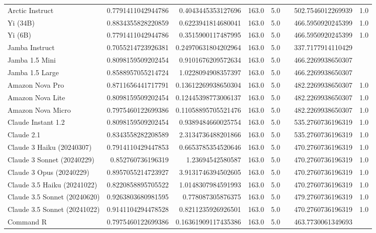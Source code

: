 \begin{table}[htp]
{\begin{tabular}{lrrrrrrr}
Arctic Instruct & 0.7791411042944786 & 0.4043445353127696 & 163.0 & 5.0 &  & 502.7546012269939 & 1.0 \\
Yi (34B) & 0.8834355828220859 & 0.6223941814680041 & 163.0 & 5.0 &  & 466.5950920245399 & 1.0 \\
Yi (6B) & 0.7791411042944786 & 0.3515900117487995 & 163.0 & 5.0 &  & 466.5950920245399 & 1.0 \\
Jamba Instruct & 0.7055214723926381 & 0.24970631804202964 & 163.0 & 5.0 &  & 337.7177914110429 &  \\
Jamba 1.5 Mini & 0.8098159509202454 & 0.9101676209572634 & 163.0 & 5.0 &  & 466.2269938650307 &  \\
Jamba 1.5 Large & 0.8588957055214724 & 1.0228094908357397 & 163.0 & 5.0 &  & 466.2269938650307 &  \\
Amazon Nova Pro & 0.8711656441717791 & 0.13612269938650304 & 163.0 & 5.0 &  & 482.2269938650307 & 1.0 \\
Amazon Nova Lite & 0.8098159509202454 & 0.12445398773006137 & 163.0 & 5.0 &  & 482.2269938650307 & 1.0 \\
Amazon Nova Micro & 0.7975460122699386 & 0.11058895705521476 & 163.0 & 5.0 &  & 482.2269938650307 & 1.0 \\
Claude Instant 1.2 & 0.8098159509202454 & 0.9389484660025754 & 163.0 & 5.0 &  & 535.2760736196319 & 1.0 \\
Claude 2.1 & 0.8343558282208589 & 2.3134736488201866 & 163.0 & 5.0 &  & 535.2760736196319 & 1.0 \\
Claude 3 Haiku (20240307) & 0.7914110429447853 & 0.6653785354520646 & 163.0 & 5.0 &  & 470.2760736196319 & 1.0 \\
Claude 3 Sonnet (20240229) & 0.852760736196319 & 1.23694542580587 & 163.0 & 5.0 &  & 470.2760736196319 & 1.0 \\
Claude 3 Opus (20240229) & 0.8957055214723927 & 3.9131746394502605 & 163.0 & 5.0 &  & 470.2760736196319 & 1.0 \\
Claude 3.5 Haiku (20241022) & 0.8220858895705522 & 1.0148307984591993 & 163.0 & 5.0 &  & 470.2760736196319 & 1.0 \\
Claude 3.5 Sonnet (20240620) & 0.9263803680981595 & 0.778087305876375 & 163.0 & 5.0 &  & 479.2760736196319 & 1.0 \\
Claude 3.5 Sonnet (20241022) & 0.9141104294478528 & 0.8211235926926501 & 163.0 & 5.0 &  & 470.2760736196319 & 1.0 \\
Command R & 0.7975460122699386 & 0.16361909117435386 & 163.0 & 5.0 &  & 463.7730061349693 &  \\

\end{tabular}}
\end{table}
